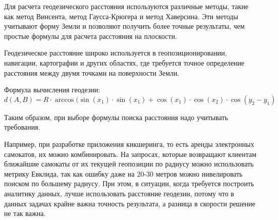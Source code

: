 Для расчета геодезического расстояния используются различные методы, такие как метод Винсента, метод Гаусса-Крюгера и метод Хаверсина. Эти методы учитывают форму Земли и позволяют получить более точные результаты, чем простые формулы для расчета расстояния на плоскости.

Геодезическое расстояние широко используется в геопозиционировании, навигации, картографии и других областях, где требуется точное определение расстояния между двумя точками на поверхности Земли.

Формула вычисления геодезии:
$$
d(A, B) = R \cdot \arccos(\sin(x_1) \cdot \sin(x_1) + \cos(x_1) \cdot \cos(x_2) \cdot \cos(y_2 - y_1)
$$

Таким образом, при выборе формулы поиска расстояния надо учитывать требования.

Например, при разработке приложения кикшеринга, то есть аренды электронных самокатов, их можно комбинировать. На запросах, которые возвращают клиентам ближайшие самокаты от их текущей геопозиции по радиусу можно использовать метрику Евклида, так как ошибку даже на 20-30 метров можно нивелировать поиском по большему радиусу.
При этом, в ситуации, когда требуется построить аналитику данных, лучше использовать расстояние геодезии, потому что в данных задачах крайне важна точность результата, а разница в скорости решение не так важна.
